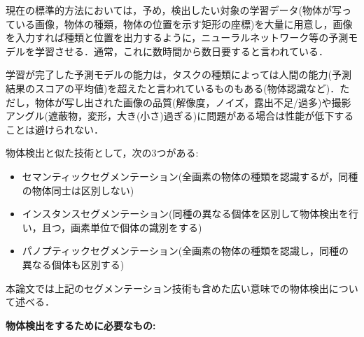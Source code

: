 \documentclass[originalpaper]{jsaiart}     %
\begin{document}
現在の標準的方法においては，予め，検出したい対象の学習データ(物体が写っている画像，物体の種類，物体の位置を示す矩形の座標)を大量に用意し，画像を入力すれば種類と位置を出力するように，ニューラルネットワーク等の予測モデルを学習させる．通常，これに数時間から数日要すると言われている．

学習が完了した予測モデルの能力は，タスクの種類によっては人間の能力(予測結果のスコアの平均値)を超えたと言われているものもある(物体認識など)．ただし，物体が写し出された画像の品質(解像度，ノイズ，露出不足/過多)や撮影アングル(遮蔽物，変形，大き(小さ)過ぎる)に問題がある場合は性能が低下することは避けられない．

物体検出と似た技術として，次の3つがある:

\begin{itemize}
    \item セマンティックセグメンテーション(全画素の物体の種類を認識するが，同種の物体同士は区別しない)
    \item インスタンスセグメンテーション(同種の異なる個体を区別して物体検出を行い，且つ，画素単位で個体の識別をする)
    \item パノプティックセグメンテーション(全画素の物体の種類を認識し，同種の異なる個体も区別する)
\end{itemize}
本論文では上記のセグメンテーション技術も含めた広い意味での物体検出について述べる．

{\bf 物体検出をするために必要なもの:}
\end{document}
